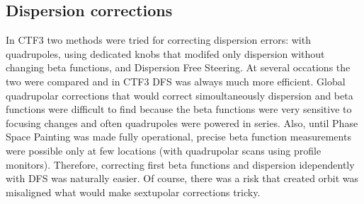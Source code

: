 \subsection{Dispersion corrections}

In CTF3 two methods were tried for correcting dispersion errors:
with quadrupoles, using dedicated knobs that modifed only dispersion without changing beta functions,
and Dispersion Free Steering.  
At several occations the two were compared and in CTF3 DFS was always much more efficient.
Global quadrupolar corrections that would correct simoultaneously dispersion and beta functions
were difficult to find because the beta functions were very sensitive to focusing changes
and often quadrupoles were powered in series. Also, until Phase Space Painting was 
made fully operational, precise beta function measurements were possible only 
at few locations (with quadrupolar scans using profile monitors).
Therefore, correcting first beta functions and dispersion idependently with DFS
was naturally easier. Of course, there was a risk that created orbit was
misaligned what would make sextupolar corrections tricky.


